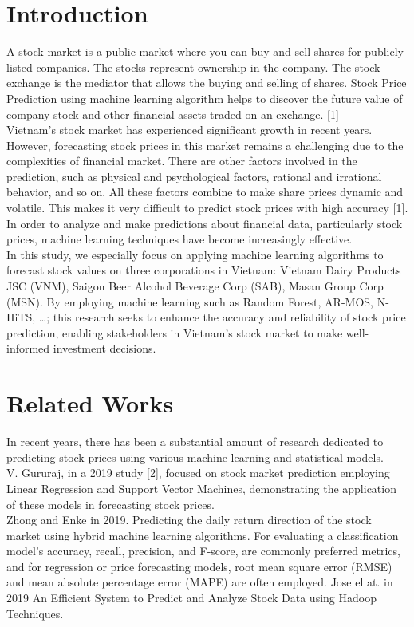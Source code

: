 \documentclass{ieeeojies}
\begin{document}
\section{Introduction}
\label{sec:introduction}
 \indent A stock market is a public market where you can buy and sell shares for publicly listed companies. The stocks represent ownership in the company. The stock exchange is the mediator that allows the buying and selling of shares. Stock Price Prediction using machine learning algorithm helps to discover the future value of company stock and other financial assets traded on an exchange. [1]\\
 \indent Vietnam’s stock market has experienced significant growth in recent years. However, forecasting stock prices in this market remains a challenging due to the complexities of financial market. There are other factors involved in the prediction, such as physical and psychological factors, rational and irrational behavior, and so on. All these factors combine to make share prices dynamic and volatile. This makes it very difficult to predict stock prices with high accuracy [1]. In order to analyze and make predictions about financial data, particularly stock prices, machine learning techniques have become increasingly effective. \\
 \indent In this study, we especially focus on applying machine learning algorithms to forecast stock values on three corporations in Vietnam: Vietnam Dairy Products JSC (VNM), Saigon Beer Alcohol Beverage Corp (SAB), Masan Group Corp (MSN). By employing machine learning such as Random Forest, AR-MOS, N-HiTS, …; this research seeks to enhance the accuracy and reliability of stock price prediction, enabling stakeholders in Vietnam's stock market to make well-informed investment decisions.
\section{Related Works}
\indent In recent years, there has been a substantial amount of research dedicated to predicting stock prices using various machine learning and statistical models.\\
\indent V. Gururaj, in a 2019 study [2], focused on stock market prediction employing Linear Regression and Support Vector Machines, demonstrating the application of these models in forecasting stock prices.\\
\indent Zhong and Enke in 2019. Predicting the daily return direction of the stock market using hybrid machine learning algorithms. For evaluating a classification model’s accuracy, recall, precision, and F-score, are commonly preferred metrics, and for regression or price forecasting models, root mean square error (RMSE) and mean absolute percentage error (MAPE) are often employed. Jose el at. in 2019 An Efficient System to Predict and Analyze Stock Data using Hadoop Techniques.
\end{document}
